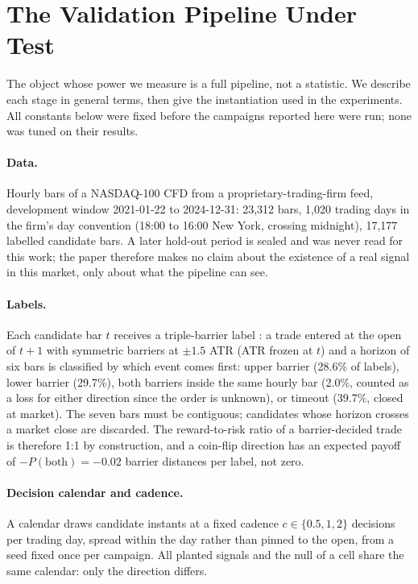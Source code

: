\documentclass[11pt]{article}
\begin{document}
\section{The Validation Pipeline Under Test}
\label{sec:pipeline}

The object whose power we measure is a full pipeline, not a statistic. We describe each stage in general terms, then give the instantiation used in the experiments. All constants below were fixed before the campaigns reported here were run; none was tuned on their results.

\paragraph{Data.}
Hourly bars of a NASDAQ-100 CFD from a proprietary-trading-firm feed, development window 2021-01-22 to 2024-12-31: 23,312 bars, 1,020 trading days in the firm's day convention (18:00 to 16:00 New York, crossing midnight), 17,177 labelled candidate bars. A later hold-out period is sealed and was never read for this work; the paper therefore makes no claim about the existence of a real signal in this market, only about what the pipeline can see.

\paragraph{Labels.}
Each candidate bar $t$ receives a triple-barrier label \citep{lopezdeprado2018}: a trade entered at the open of $t+1$ with symmetric barriers at $\pm 1.5$ ATR (ATR frozen at $t$) and a horizon of six bars is classified by which event comes first: upper barrier (28.6\% of labels), lower barrier (29.7\%), both barriers inside the same hourly bar (2.0\%, counted as a loss for either direction since the order is unknown), or timeout (39.7\%, closed at market). The seven bars must be contiguous; candidates whose horizon crosses a market close are discarded. The reward-to-risk ratio of a barrier-decided trade is therefore 1:1 by construction, and a coin-flip direction has an expected payoff of $-P(\text{both}) = -0.02$ barrier distances per label, not zero.

\paragraph{Decision calendar and cadence.}
A calendar draws candidate instants at a fixed cadence $c \in \{0.5, 1, 2\}$ decisions per trading day, spread within the day rather than pinned to the open, from a seed fixed once per campaign. All planted signals and the null of a cell share the same calendar: only the direction differs.
\end{document}

